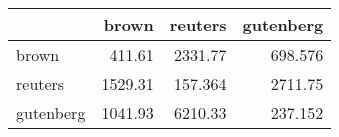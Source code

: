 \begin{tabular}{lrrr}
\hline
           &   brown &   reuters &   gutenberg \\
\hline
 brown     &  411.61 &  2331.77  &     698.576 \\
 reuters   & 1529.31 &   157.364 &    2711.75  \\
 gutenberg & 1041.93 &  6210.33  &     237.152 \\
\hline
\end{tabular}